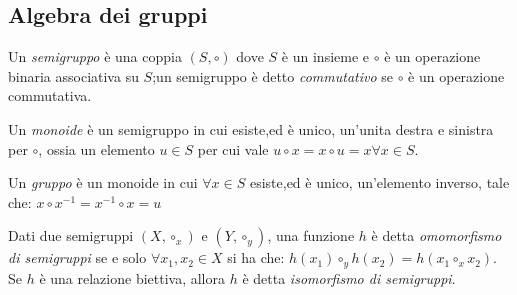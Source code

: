 \subsection{Algebra dei gruppi}
Un \emph{semigruppo} è una coppia $(S,\circ)$ dove $S$ è un insieme e $\circ$ è
un operazione binaria associativa su $S$;un semigruppo è detto \emph{commutativo}
se $\circ$ è un operazione commutativa.

Un \emph{monoide} è un semigruppo in cui esiste,ed è unico, un'unita destra e sinistra per $\circ$,
ossia un elemento $u \in S$ per cui vale $u \circ x = x \circ u = x \forall x \in S$.

Un \emph{gruppo} è un monoide in cui $\forall x \in S$ esiste,ed è unico, un'elemento inverso,
tale che: $x \circ x^{-1} = x^{-1} \circ x = u$

Dati due semigruppi $(X,\circ _x)$ e $(Y,\circ_y)$, una funzione $h$ è detta
\emph{omomorfismo di semigruppi} se e solo $\forall x_1,x_2 \in X$ si ha che:
$h(x_1)\circ_y h(x_2) = h(x_1 \circ_x x_2)$.
Se $h$ è una relazione biettiva, allora $h$ è detta \emph{isomorfismo di semigruppi}.
